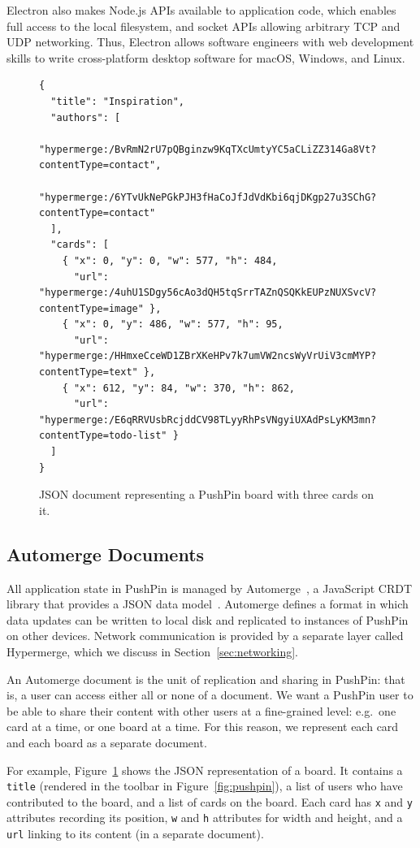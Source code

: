 \documentclass[sigplan,10pt]{acmart}
\begin{document}
Electron also makes Node.js APIs available to application code, which enables full access to the local filesystem, and socket APIs allowing arbitrary TCP and UDP networking.
Thus, Electron allows software engineers with web development skills to write cross-platform desktop software for macOS, Windows, and Linux.

\begin{figure}
\begin{verbatim}
{
  "title": "Inspiration",
  "authors": [
    "hypermerge:/BvRmN2rU7pQBginzw9KqTXcUmtyYC5aCLiZZ314Ga8Vt?contentType=contact",
    "hypermerge:/6YTvUkNePGkPJH3fHaCoJfJdVdKbi6qjDKgp27u3SChG?contentType=contact"
  ],
  "cards": [
    { "x": 0, "y": 0, "w": 577, "h": 484,
      "url": "hypermerge:/4uhU1SDgy56cAo3dQH5tqSrrTAZnQSQKkEUPzNUXSvcV?contentType=image" },
    { "x": 0, "y": 486, "w": 577, "h": 95,
      "url": "hypermerge:/HHmxeCceWD1ZBrXKeHPv7k7umVW2ncsWyVrUiV3cmMYP?contentType=text" },
    { "x": 612, "y": 84, "w": 370, "h": 862,
      "url": "hypermerge:/E6qRRVUsbRcjddCV98TLyyRhPsVNgyiUXAdPsLyKM3mn?contentType=todo-list" }
  ]
}
\end{verbatim}
\caption{JSON document representing a PushPin board with three cards on it.}
\label{fig:board-json}
\end{figure}


\subsection{Automerge Documents}

All application state in PushPin is managed by Automerge~\cite{Automerge:2018,Automerge}, a JavaScript CRDT library that provides a JSON data model~\cite{Kleppmann:2017ca}.
Automerge defines a format in which data updates can be written to local disk and replicated to instances of PushPin on other devices.
Network communication is provided by a separate layer called Hypermerge, which we discuss in Section~\ref{sec:networking}.

An Automerge document is the unit of replication and sharing in PushPin: that is, a user can access either all or none of a document.
We want a PushPin user to be able to share their content with other users at a fine-grained level: e.g.\ one card at a time, or one board at a time.
For this reason, we represent each card and each board as a separate document.

For example, Figure~\ref{fig:board-json} shows the JSON representation of a board.
It contains a \texttt{title} (rendered in the toolbar in Figure~\ref{fig:pushpin}), a list of users who have contributed to the board, and a list of cards on the board.
Each card has \texttt{x} and \texttt{y} attributes recording its position, \texttt{w} and \texttt{h} attributes for width and height, and a \texttt{url} linking to its content (in a separate document).
\end{document}
